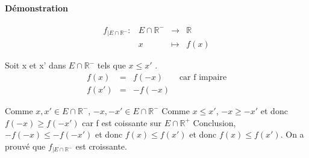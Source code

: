 \paragraph{Démonstration} 
\begin{align*}
	f_{|E\cap \mathbb{R}^-} : & E\cap \mathbb{R}^- &\rightarrow &\mathbb{R}\\
												 & x & \mapsto & f(x)
\end{align*}

Soit x et x' dans $E \cap \mathbb{R}^-$ tels que $x \leq x'$ . 
\begin{align*}
	f(x) & = & f(-x) & \text{ car f impaire} \\
	f(x') & = & -f(-x)
\end{align*}

Comme $x, x' \in E \cap \mathbb{R}^-$, $-x, -x' \in E \cap \mathbb{R}^-$
Comme $x \leq x'$, $-x \geq -x'$
et donc $f(-x) \geq f(-x')$ car f est coissante sur $E\cap \mathbb{R}^+$
Conclusion, $-f(-x) \leq -f(-x')$ et donc $f(x) \leq f(x')$ et donc $f(x) \leq f(x')$. On a prouvé que $f_{|E \cap \mathbb{R}^-}$ est croissante.
